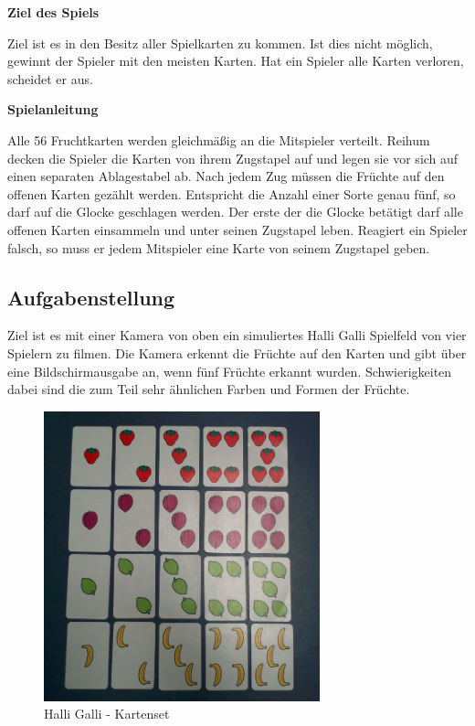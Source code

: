 \textbf{Ziel des Spiels}

Ziel ist es in den Besitz aller Spielkarten zu kommen. Ist dies nicht möglich, gewinnt der Spieler mit den meisten Karten. Hat ein Spieler alle Karten verloren, scheidet er aus. 

\textbf{Spielanleitung}

Alle 56 Fruchtkarten werden gleichmäßig an die Mitspieler verteilt. Reihum decken die Spieler die Karten von ihrem Zugstapel auf und legen sie vor sich auf einen separaten Ablagestabel ab. Nach jedem Zug müssen die Früchte auf den offenen Karten gezählt werden. Entspricht die Anzahl einer Sorte genau fünf, so darf auf die Glocke geschlagen werden. Der erste der die Glocke betätigt darf alle offenen Karten einsammeln und unter seinen Zugstapel leben. Reagiert ein Spieler falsch, so muss er jedem Mitspieler eine Karte von seinem Zugstapel geben. 

\subsection{Aufgabenstellung}

Ziel ist es mit einer Kamera von oben ein simuliertes Halli Galli Spielfeld von vier Spielern zu filmen. Die Kamera erkennt die Früchte auf den Karten und gibt über eine Bildschirmausgabe an, wenn fünf Früchte erkannt wurden. Schwierigkeiten dabei sind die zum Teil  sehr ähnlichen Farben und Formen der Früchte. \\

\begin{figure}[H]
    \centering
    \includegraphics[width=8cm]{Abbildungen/Kartenset}
    \caption[Cocer]{Halli Galli - Kartenset}
    \label{fig:Kartenset}
\end{figure}

